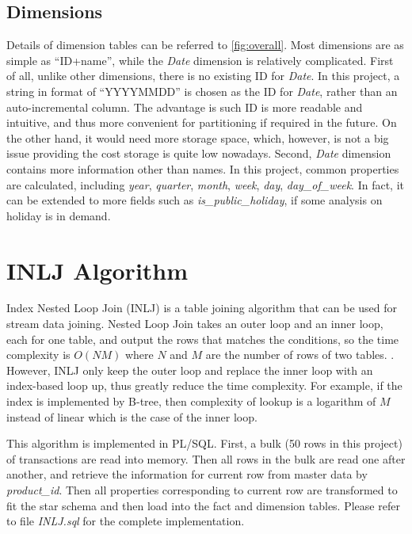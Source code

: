 \documentclass[
  a4paper,
]{article}
\begin{document}
\hypertarget{dimensions}{%
\subsection{Dimensions}\label{dimensions}}

Details of dimension tables can be referred to \cref{fig:overall}. Most
dimensions are as simple as ``ID+name'', while the \emph{Date} dimension
is relatively complicated. First of all, unlike other dimensions, there
is no existing ID for \emph{Date}. In this project, a string in format
of ``YYYYMMDD'' is chosen as the ID for \emph{Date}, rather than an
auto-incremental column. The advantage is such ID is more readable and
intuitive, and thus more convenient for partitioning if required in the
future. On the other hand, it would need more storage space, which,
however, is not a big issue providing the cost storage is quite low
nowadays. Second, \emph{Date} dimension contains more information other
than names. In this project, common properties are calculated, including
\emph{year}, \emph{quarter}, \emph{month}, \emph{week}, \emph{day},
\emph{day\_of\_week}. In fact, it can be extended to more fields such as
\emph{is\_public\_holiday}, if some analysis on holiday is in demand.

\hypertarget{inlj-algorithm}{%
\section{INLJ Algorithm}\label{inlj-algorithm}}

Index Nested Loop Join (INLJ) is a table joining algorithm that can be
used for stream data joining. Nested Loop Join takes an outer loop and
an inner loop, each for one table, and output the rows that matches the
conditions, so the time complexity is \(O(N M)\) where \(N\) and \(M\)
are the number of rows of two tables. . However, INLJ only keep the
outer loop and replace the inner loop with an index-based loop up, thus
greatly reduce the time complexity. For example, if the index is
implemented by B-tree, then complexity of lookup is a logarithm of \(M\)
instead of linear which is the case of the inner loop.

This algorithm is implemented in PL/SQL. First, a bulk (50 rows in this
project) of transactions are read into memory. Then all rows in the bulk
are read one after another, and retrieve the information for current row
from master data by \emph{product\_id}. Then all properties
corresponding to current row are transformed to fit the star schema and
then load into the fact and dimension tables. Please refer to file
\emph{INLJ.sql} for the complete implementation.
\end{document}
